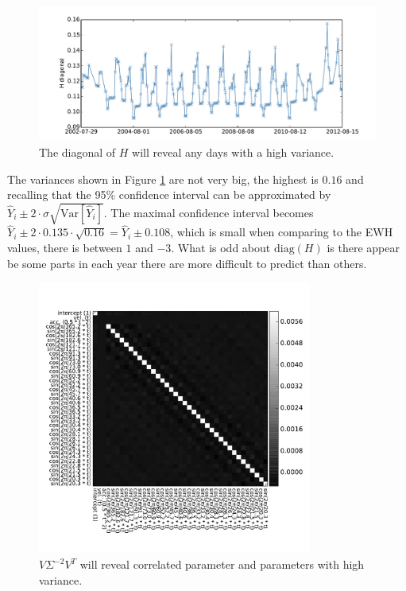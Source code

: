 \begin{figure}[H]
	\centering
	\includegraphics[width=\textwidth]{figures/ols-world-diagnostics-diagH}
	\caption{The diagonal of $H$ will reveal any days with a high variance.}
	\label{fig:ols-world-performance-diagH}
\end{figure}

The variances shown in Figure \ref{fig:ols-world-performance-diagH} are not very big, the highest is $0.16$ and recalling that the 95\% confidence interval can be approximated by $\hat{Y}_i \pm 2 \cdot \hat{\sigma} \sqrt{\mathrm{Var}[\hat{Y}_i]}$. The maximal confidence interval becomes $\hat{Y}_i \pm 2 \cdot 0.135 \cdot \sqrt{0.16} = \hat{Y}_i \pm 0.108$, which is small when comparing to the EWH values, there is between $1$ and $-3$. What is odd about $\mathrm{diag}(H)$ is there appear be some parts in each year there are more difficult to predict than others. 

\begin{figure}[H]
	\centering
	\includegraphics[height=9cm]{figures/ols-world-diagnostics-cov}
	\caption{$V \Sigma^{-2} V^T$ will reveal correlated parameter and parameters with high variance.}
	\label{fig:ols-world-performance-cov}
\end{figure}

